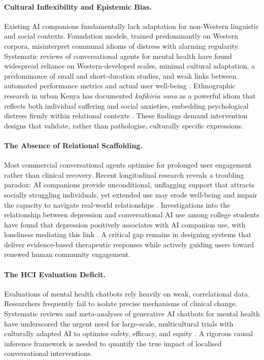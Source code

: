 \documentclass[12pt,a4paper]{article}
\begin{document}
\paragraph{Cultural Inflexibility and Epistemic Bias.}
Existing AI companions fundamentally lack adaptation for non-Western linguistic and social contexts. Foundation models, trained predominantly on Western corpora, misinterpret communal idioms of distress with alarming regularity. Systematic reviews of conversational agents for mental health have found widespread reliance on Western-developed scales, minimal cultural adaptation, a predominance of small and short-duration studies, and weak links between automated performance metrics and actual user well-being \citep{EvalSysReview2026}. Ethnographic research in urban Kenya has documented \textit{kufikiria sana} as a powerful idiom that reflects both individual suffering and social anxieties, embedding psychological distress firmly within relational contexts \citep{Mendenhall2019}. These findings demand intervention designs that validate, rather than pathologise, culturally specific expressions.

\paragraph{The Absence of Relational Scaffolding.}
Most commercial conversational agents optimise for prolonged user engagement rather than clinical recovery. Recent longitudinal research reveals a troubling paradox: AI companions provide unconditional, unflagging support that attracts socially struggling individuals, yet extended use may erode well-being and impair the capacity to navigate real-world relationships \citep{Jovanovic2026}. Investigations into the relationship between depression and conversational AI use among college students have found that depression positively associates with AI companion use, with loneliness mediating this link \citep{DepressionAI2025}. A critical gap remains in designing systems that deliver evidence-based therapeutic responses while actively guiding users toward renewed human community engagement.

\paragraph{The HCI Evaluation Deficit.}
Evaluations of mental health chatbots rely heavily on weak, correlational data. Researchers frequently fail to isolate precise mechanisms of clinical change. Systematic reviews and meta-analyses of generative AI chatbots for mental health have underscored the urgent need for large-scale, multicultural trials with culturally adapted AI to optimise safety, efficacy, and equity \citep{Viduani2025}. A rigorous causal inference framework is needed to quantify the true impact of localised conversational interventions.
\end{document}
